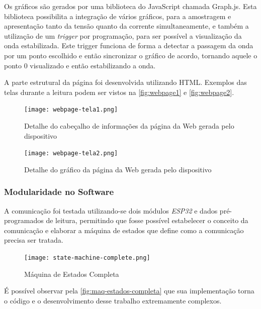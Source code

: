 
Os gráficos são gerados por uma biblioteca do JavaScript chamada Graph.js. Esta biblioteca possibilita a integração de vários gráficos, para a amostragem e apresentação tanto da tensão quanto da corrente simultaneamente, e também a utilização de um \textit{trigger} por programação, para ser possível a visualização da onda estabilizada. Este trigger funciona de forma a detectar a passagem da onda por um ponto escolhido e então sincronizar o gráfico de acordo, tornando aquele o ponto 0 visualizado e então estabilizando a onda.

A parte estrutural da página foi desenvolvida utilizando \gls{HTML}. Exemplos das telas durante a leitura podem ser vistos na \autoref{fig:webpage1} e \autoref{fig:webpage2}.

\begin{figure}[h!]
    \centering
    \caption{Detalhe do cabeçalho de informações da página da Web gerada pelo dispositivo}
    \texttt{[image: webpage-tela1.png]}
    \label{fig:webpage1}
    \fonte{}
\end{figure}

\begin{figure}[h!]
    \centering
    \caption{Detalhe do gráfico da página da Web gerada pelo dispositivo}
    \texttt{[image: webpage-tela2.png]}
    \label{fig:webpage2}
    \fonte{}
\end{figure}

\subsubsection{Modularidade no Software}\label{modular-softw}

A comunicação foi testada utilizando-se dois módulos \textit{ESP32} e dados pré-programados de leitura, permitindo que fosse possível estabelecer o conceito da comunicação e elaborar a máquina de estados que define como a comunicação precisa ser tratada.

\begin{figure}[h!]
    \centering
    \caption{Máquina de Estados Completa}
    \texttt{[image: state-machine-complete.png]}
    \label{fig:maq-estados-completa}
    \fonte{}
\end{figure}

É possível observar pela \autoref{fig:maq-estados-completa} que sua implementação torna o código e o desenvolvimento desse trabalho extremamente complexos.

